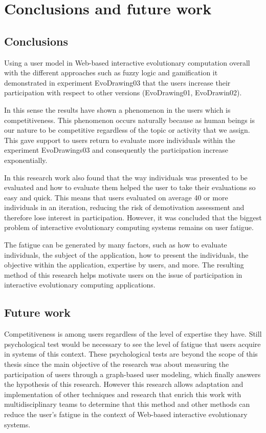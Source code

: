 \chapter{Conclusions and future work} \label{sec:5}

\section{Conclusions}

Using a user model in Web-based interactive evolutionary computation  overall
with the different approaches such as fuzzy logic and gamification it
demonstrated  in experiment EvoDrawing03 that the users increase their
participation with respect to other versions (EvoDrawing01, EvoDrawin02).

In this sense the results have shown a phenomenon in the users which is
competitiveness. This phenomenon occurs naturally because as human beings is our
nature to be competitive regardless of the topic or activity that we assign.
This gave support to users return to evaluate more individuals
within the experiment EvoDrawings03 and consequently the participation increase
exponentially.

In this research work also found that the way individuals was presented to be
evaluated and how to evaluate them helped the user to take their evaluations so
easy and quick. This means that users evaluated on average 40 or more
individuals in an iteration, reducing the risk of demotivation assessment and
therefore lose interest in participation. However, it was concluded that the
biggest problem of interactive evolutionary computing systems remains on user
fatigue.

The fatigue can be generated by many factors, such as how to evaluate
individuals, the subject of the application, how to present the individuals, the
objective within the application, expertise by users, and more. The resulting
method of this research helps motivate users on the issue of participation in
interactive evolutionary computing applications.


\section{Future work}

Competitiveness is among users regardless of the level of expertise they have.
Still psychological test would be necessary to see the level of fatigue that
users acquire in systems of this context. These psychological tests are beyond
the scope of this thesis since the main objective of the research was about
measuring the participation of users through a graph-based user modeling, which
finally answers  the hypothesis of this research. However this research allows
adaptation and implementation of other techniques and research that enrich this
work with multidisciplinary teams to determine that this method and other
methods can reduce the user's fatigue in the context of Web-based interactive
evolutionary systems.

